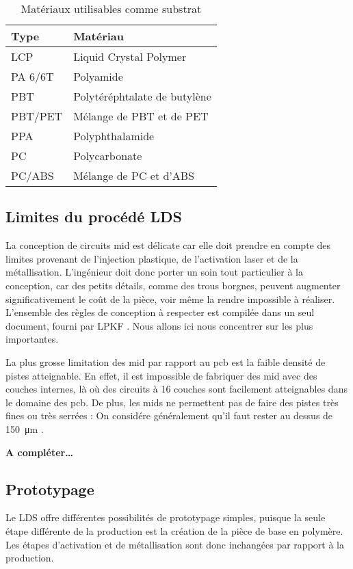 \begin{table}[h]
\centering
\begin{tabular}{l l}
\toprule 
Type & Matériau \\
\midrule %
LCP & Liquid Crystal Polymer \\
PA 6/6T & Polyamide \\
PBT & Polytéréphtalate de butylène \\
PBT/PET & Mélange de PBT et de PET \\
PPA & Polyphthalamide \\
PC & Polycarbonate \\
PC/ABS & Mélange de PC et d'ABS \\ 
\bottomrule 
\end{tabular}
\caption{Matériaux utilisables comme substrat}
\label{tab:mid-materials}
\end{table}

\subsection{Limites du procédé LDS}
La conception de circuits \gls{mid} est délicate car elle doit prendre en compte des limites provenant de l'injection plastique, de l'activation laser et de la métallisation.
L'ingénieur doit donc porter un soin tout particulier à la conception, car des petits détails, comme des trous borgnes, peuvent augmenter significativement le coût de la pièce, voir même la rendre impossible à réaliser.
L'ensemble des règles de conception à respecter est compilée dans un seul document, fourni par LPKF \cite{mid-design-rules}.
Nous allons ici nous concentrer sur les plus importantes.

La plus grosse limitation des \gls{mid} par rapport au \gls{pcb} est la faible densité de pistes atteignable.
En effet, il est impossible de fabriquer des \gls{mid} avec des couches internes, là où des circuits à 16 couches sont facilement atteignables dans le domaine des \gls{pcb}.
De plus, les \glspl{mid} ne permettent pas de faire des pistes très fines ou très serrées : On considére généralement qu'il faut rester au dessus de \SI{150}{\micro\meter} .

\textbf{A compléter\ldots}


\subsection{Prototypage}
Le LDS offre différentes possibilités de prototypage simples, puisque la seule étape différente de la production est la 
création de la pièce de base en polymère. Les étapes d'activation et de métallisation sont donc inchangées par rapport à la production.


